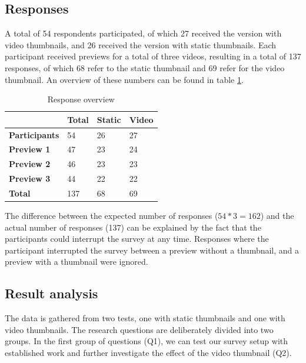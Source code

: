 \documentclass{../resources/sig-alternate-05-2015}
\begin{document}
\subsection{Responses}

A total of 54 respondents participated, of which 27 received the version with video thumbnails, and 26 received the version with static thumbnails. Each participant received previews for a total of three videos, resulting in a total of 137 responses, of which 68 refer to the static thumbnail and 69 refer for the video thumbnail. An overview of these numbers can be found in table \ref{table: number of responses table}.

\begin{table}[h]
\centering
\begin{tabular}{@{}llll@{}}
\textbf{}             & \textbf{Total} & \textbf{Static} & \textbf{Video} \\ \toprule
\textbf{Participants} & 54             & 26              & 27             \\ \midrule
\textbf{Preview 1}    & 47             & 23              & 24             \\
\textbf{Preview 2}    & 46             & 23              & 23             \\
\textbf{Preview 3}    & 44             & 22              & 22             \\ \bottomrule
\textbf{Total}        & 137            & 68              & 69             \\
\end{tabular}
\caption{Response overview}
\label{table: number of responses table}
\end{table}

The difference between the expected number of responses ($54 * 3 = 162$) and the actual number of responses (137) can be explained by the fact that the participants could interrupt the survey at any time. Responses where the participant interrupted the survey between a preview without a thumbnail, and a preview with a thumbnail were ignored.

\subsection{Result analysis}

The data is gathered from two tests, one with static thumbnails and one with video thumbnails. The research questions are deliberately divided into two groups. In the first group of questions (Q1), we can test our survey setup with established work and further investigate the effect of the video thumbnail (Q2).
\end{document}
